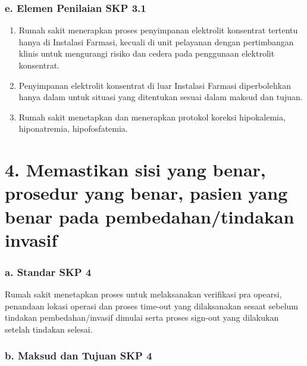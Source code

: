\documentclass[
]{book}
\providecommand{\tightlist}{%
  \setlength{\itemsep}{0pt}\setlength{\parskip}{0pt}}
\begin{document}
\hypertarget{e.-elemen-penilaian-skp-3.1}{%
\subsubsection*{e. Elemen Penilaian SKP 3.1}\label{e.-elemen-penilaian-skp-3.1}}

\begin{enumerate}
\def\labelenumi{\arabic{enumi}.}
\tightlist
\item
  Rumah sakit menerapkan proses penyimpanan elektrolit konsentrat tertentu hanya di Instalasi Farmasi, kecuali di unit pelayanan dengan pertimbangan klinis untuk mengurangi risiko dan cedera pada penggunaan elektrolit konsentrat.
\item
  Penyimpanan elektrolit konsentrat di luar Instalasi Farmasi diperbolehkan hanya dalam untuk situasi yang ditentukan sesuai dalam maksud dan tujuan.
\item
  Rumah sakit menetapkan dan menerapkan protokol koreksi hipokalemia, hiponatremia, hipofosfatemia.
\end{enumerate}

\hypertarget{memastikan-sisi-yang-benar-prosedur-yang-benar-pasien-yang-benar-pada-pembedahantindakan-invasif}{%
\section*{4. Memastikan sisi yang benar, prosedur yang benar, pasien yang benar pada pembedahan/tindakan invasif}\label{memastikan-sisi-yang-benar-prosedur-yang-benar-pasien-yang-benar-pada-pembedahantindakan-invasif}}

\hypertarget{a.-standar-skp-4}{%
\subsubsection*{a. Standar SKP 4}\label{a.-standar-skp-4}}

Rumah sakit menetapkan proses untuk melaksanakan verifikasi pra opearsi, penandaan lokasi operasi dan proses time-out yang dilaksanakan sesaat sebelum tindakan pembedahan/invasif dimulai serta proses sign-out yang dilakukan setelah tindakan selesai.

\hypertarget{b.-maksud-dan-tujuan-skp-4}{%
\subsubsection*{b. Maksud dan Tujuan SKP 4}\label{b.-maksud-dan-tujuan-skp-4}}
\end{document}

